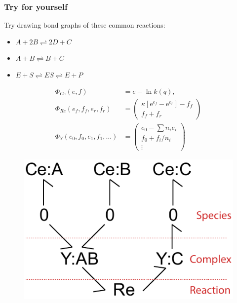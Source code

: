 \documentclass[10pt,reqno]{beamer}
\newcommand{\e}{\mathrm{e}}
\begin{document}
\begin{frame}
\frametitle{Try for yourself}
Try drawing bond graphs of these common reactions:
\begin{itemize}
	\item $A+2B \rightleftharpoons 2D+C$
	\item $A+B \rightleftharpoons B+C$
	\item $E + S \rightleftharpoons ES \rightleftharpoons E+P$
\end{itemize}
\vfill
{\scriptsize
	\begin{minipage}{0.475\textwidth}
		\begin{align*}
		\Phi_{Ce}(e,f) &= e - \ln k(q),\\
		\Phi_{Re}(e_f,f_f,e_r,f_r) &= \left(
		\begin{matrix}
		\kappa\left[\e^{e_f} - \e^{e_r}\right] - f_f\\
		f_f +  f_r
		\end{matrix}
		\right)\\
		\Phi_{Y}(e_0,f_0, e_1,f_1,\ldots) &= \left(\begin{matrix}
		e_0 - \sum n_ie_i \\
		f_0 + f_i/n_i\\
		\vdots
		\end{matrix}\right)
		\end{align*}
	\end{minipage}
\begin{minipage}{0.475\textwidth}
	\raggedright
	\begin{figure}
	\includegraphics[width=0.75\linewidth]{images/bondgraph_abc}
	\end{figure}
\end{minipage}}
\end{frame}
\end{document}
